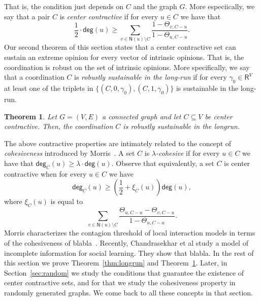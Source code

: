 \documentclass[letterpaper,11pt]{article}
\newcommand{\RR}{\mathsf{R}}
\newcommand{\nsf}{\mathsf{N}}
\newcommand{\degsf}{\mathsf{deg}}
\newtheorem{theorem}{Theorem}
\newcommand{\vvcom}[1]{\todo[color=red!25!white]{Victor: #1}}
\begin{document}
That is, the condition just depends on $C$ and the graph $G$.  
More especiically, we say that a pair $C$ is {\it center contractive} if for every $u\in C$ we have that 
\begin{equation*}
\frac{1}{2}\cdot \degsf(u)\ge \sum_{v\in \nsf(u)\setminus C}\frac{1-\Theta_{v,C-u}}{1-\Theta_{u,C-u}}.
\end{equation*}
Our second theorem of this section states that a center contractive set can sustain an extreme opinion for every vector of intrinsic opinions. 
That is, the coordination is robust on the set of intrinsic opinions.
More specifically, we say that a coordination $C$ is {\it robustly sustainable in the long-run} if for every $\gamma_0\in \RR^V$ at least one of the triplets in $\{(C,0,\gamma_0),(C,1,\gamma_0)\}$ is sustainable in the long-run. 
\begin{theorem}
\label{thm:alternatives}
Let $G=(V,E)$ a connected graph and let $C\subseteq V$ be center contractive.
Then, the coordination $C$ is robustly sustainable in the longrun.
\end{theorem}

The above contractive properties are intimately related to the concept of {\it cohesiveness} introduced by Morris~\cite{morris}.
A set $C$ is {\it $\lambda$-cohesive} if for every $u\in C$ we have that $\degsf_C(u)\ge \lambda\cdot \degsf(u)$.
Observe that equivalently, a set $C$ is center contractive when for every $u\in C$ we have
\begin{equation*}
\degsf_C(u)\ge \left(\frac{1}{2}+\xi_C(u)\right)\degsf(u),
\end{equation*}
where $\xi_C(u)$ is equal to 
\begin{equation*}
\sum_{v\in \nsf(u)\setminus C}\frac{\Theta_{u,C-u}-\Theta_{v,C-u}}{1-\Theta_{u,C-u}}.
\end{equation*}
Morris characterizes the contagion threshold of local interaction models in terms of the cohesiveness of {\color{red} blabla}~\cite{morris}.
Recently, Chandrasekhar et al study a model of incomplete information for social learning. 
They show that {\color{red} blabla}.\vvcom{hablar de los clanes de Xandri aca}
In the rest of this section we prove Theorem~\ref{thm:longrun} and Theorem~\ref{thm:alternatives}.
Later, in Section~\ref{sec:random} we study the conditions that guarantee the existence of center contractive sets, and for that we study the cohesiveness property in randomly generated graphs.
We come back to all these concepts in that section.
\end{document}
